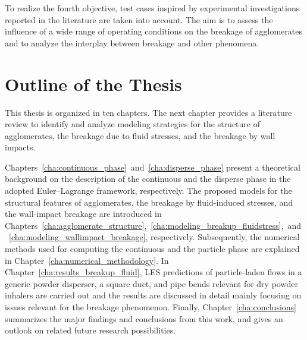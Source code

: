 To realize the fourth objective, test cases inspired by experimental
investigations reported in the literature are taken into account. The
aim is to assess the influence of a wide range of operating conditions
on the breakage of agglomerates and to analyze the interplay between
breakage and other phenomena.

\section{Outline of the Thesis}
\label{sec:Outline}

This thesis is organized in ten chapters. The next chapter provides a
literature review to identify and analyze modeling strategies for the
structure of agglomerates, the breakage due to fluid stresses, and the
breakage by wall impacts.

 Chapters~\ref{cha:continuous_phase}~and~\ref{cha:disperse_phase}
 present a theoretical background on the description of the continuous
 and the disperse phase in the adopted Euler--Lagrange framework,
 respectively.  The proposed models for the structural features of
 agglomerates, the breakage by fluid-induced stresses, and the
 wall-impact breakage are introduced in
 Chapters~\ref{cha:agglomerate_structure},~\ref{cha:modeling_breakup_fluidstress},~and~\ref{cha:modeling_wallimpact_breakage},
 respectively. Subsequently, the numerical methods used for computing
 the continuous and the particle phase are explained in
 Chapter~\ref{cha:numerical_methodology}. In
 Chapter~\ref{cha:results_breakup_fluid}, LES predictions of
 particle-laden flows in a generic powder disperser, a square duct,
 and pipe bends relevant for dry powder inhalers are carried out and
 the results are discussed in detail mainly focusing on issues
 relevant for the breakage phenomenon.  Finally,
 Chapter~\ref{cha:conclusions} summarizes the major findings and
 conclusions from this work, and gives an outlook on related future
 research possibilities.

